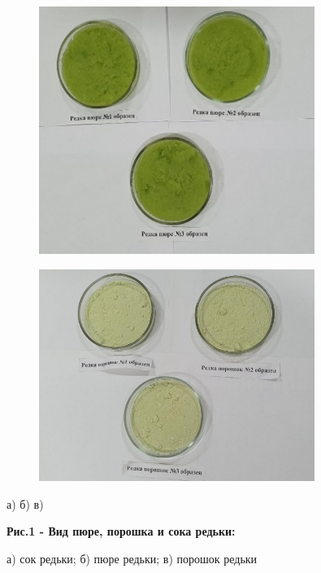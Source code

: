 \begin{figure}[H]
	\centering
	\includegraphics[width=0.8\textwidth]{media/pish/image59}
	\caption*{}
\end{figure}


\begin{figure}[H]
	\centering
	\includegraphics[width=0.8\textwidth]{media/pish/image60}
	\caption*{}
\end{figure}


а) б) в)

{\bfseries Рис.1 - Вид пюре, порошка и сока редьки:}

а) сок редьки; б) пюре редьки; в) порошок редьки

